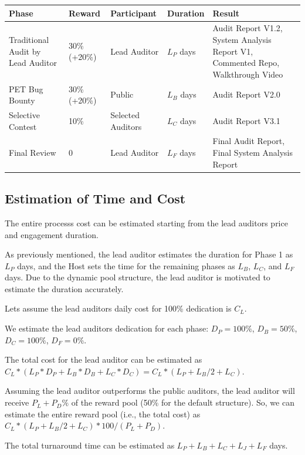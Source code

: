 \documentclass[10pt]{extarticle}
\begin{document}
\begin{longtable}[]{@{}lllll@{}}
\toprule\noalign{}
Phase & Reward & Participant & Duration & Result \\
\midrule\noalign{}
\endhead
\bottomrule\noalign{}
\endlastfoot
Traditional Audit by Lead Auditor & 30\% (+20\%) & Lead Auditor &
\(L_P\) days & Audit Report V1.2, System Analysis Report V1, Commented
Repo, Walkthrough Video \\
PET Bug Bounty & 30\% (+20\%) & Public & \(L_B\) days & Audit Report
V2.0 \\
Selective Contest & 10\% & Selected Auditors & \(L_C\) days & Audit
Report V3.1 \\
Final Review & 0 & Lead Auditor & \(L_F\) days & Final Audit Report,
Final System Analysis Report \\
\end{longtable}

\subsection{ Estimation of Time and
Cost}\label{46-estimation-of-time-and-cost}

The entire process\textquotesingle s cost can be estimated starting from
the lead auditor\textquotesingle s price and engagement duration.

As previously mentioned, the lead auditor estimates the duration for
Phase 1 as \(L_P\) days, and the Host sets the time for the remaining
phases as \(L_B\), \(L_C\), and \(L_F\) days. Due to the dynamic pool
structure, the lead auditor is motivated to estimate the duration
accurately.

Let\textquotesingle s assume the lead auditor\textquotesingle s daily
cost for 100\% dedication is \(C_L\).

We estimate the lead auditor\textquotesingle s dedication for each
phase: \(D_P = 100\%\), \(D_B = 50\%\), \(D_C = 100\%\), \(D_F = 0\%\).

The total cost for the lead auditor can be estimated as
\(C_L * (L_P * D_P + L_B * D_B + L_C * D_C) = C_L * (L_P + L_B/2 + L_C)\).

Assuming the lead auditor outperforms the public auditors, the lead
auditor will receive \(P_L + P_D\%\) of the reward pool (50\% for the
default structure). So, we can estimate the entire reward pool (i.e.,
the total cost) as \(C_L * (L_P + L_B/2 + L_C) * 100 / (P_L + P_D)\).

The total turnaround time can be estimated as
\(L_P + L_B + L_C + L_J + L_F\) days.
\end{document}
